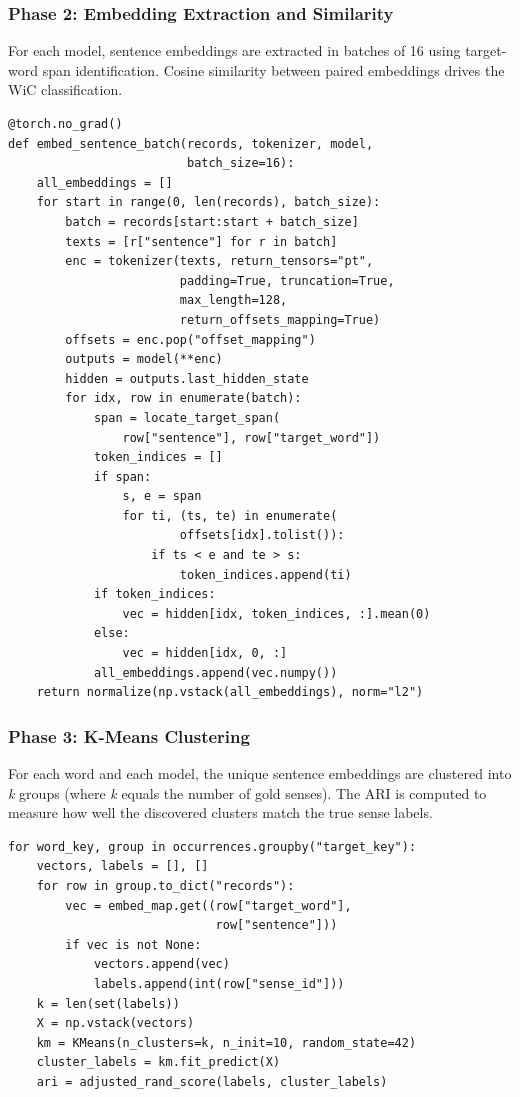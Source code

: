 \documentclass[12pt,a4paper,oneside]{article}
\begin{document}
\subsubsection{Phase 2: Embedding Extraction and Similarity}

For each model, sentence embeddings are extracted in batches of 16 using target-word span identification. Cosine similarity between paired embeddings drives the WiC classification.

\begin{lstlisting}[caption={Target-word embedding extraction},label=lst:embed]
@torch.no_grad()
def embed_sentence_batch(records, tokenizer, model,
                         batch_size=16):
    all_embeddings = []
    for start in range(0, len(records), batch_size):
        batch = records[start:start + batch_size]
        texts = [r["sentence"] for r in batch]
        enc = tokenizer(texts, return_tensors="pt",
                        padding=True, truncation=True,
                        max_length=128,
                        return_offsets_mapping=True)
        offsets = enc.pop("offset_mapping")
        outputs = model(**enc)
        hidden = outputs.last_hidden_state
        for idx, row in enumerate(batch):
            span = locate_target_span(
                row["sentence"], row["target_word"])
            token_indices = []
            if span:
                s, e = span
                for ti, (ts, te) in enumerate(
                        offsets[idx].tolist()):
                    if ts < e and te > s:
                        token_indices.append(ti)
            if token_indices:
                vec = hidden[idx, token_indices, :].mean(0)
            else:
                vec = hidden[idx, 0, :]
            all_embeddings.append(vec.numpy())
    return normalize(np.vstack(all_embeddings), norm="l2")
\end{lstlisting}

\subsubsection{Phase 3: K-Means Clustering}

For each word and each model, the unique sentence embeddings are clustered into \textit{k} groups (where \textit{k} equals the number of gold senses). The ARI is computed to measure how well the discovered clusters match the true sense labels.

\begin{lstlisting}[caption={K-means clustering per word},label=lst:cluster]
for word_key, group in occurrences.groupby("target_key"):
    vectors, labels = [], []
    for row in group.to_dict("records"):
        vec = embed_map.get((row["target_word"],
                             row["sentence"]))
        if vec is not None:
            vectors.append(vec)
            labels.append(int(row["sense_id"]))
    k = len(set(labels))
    X = np.vstack(vectors)
    km = KMeans(n_clusters=k, n_init=10, random_state=42)
    cluster_labels = km.fit_predict(X)
    ari = adjusted_rand_score(labels, cluster_labels)
\end{lstlisting}
\end{document}
